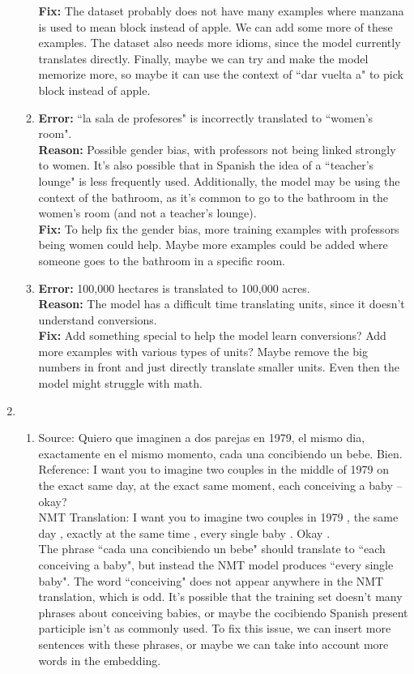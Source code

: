 \documentclass{article}
\begin{document}
\begin{enumerate}[label=(\alph*)]
\begin{enumerate}[label=\roman*.]
        \textbf{Fix:} The dataset probably does not have many examples where manzana is used to mean block instead of apple. We can add some more of these examples. The dataset also needs more idioms, since the model currently translates directly. Finally, maybe we can try and make the model memorize more, so maybe it can use the context of ``dar vuelta a" to pick block instead of apple.
        \item
        \textbf{Error:} ``la sala de profesores" is incorrectly translated to ``women's room". \\
        \textbf{Reason:} Possible gender bias, with professors not being linked strongly to women. It's also possible that in Spanish the idea of a ``teacher's lounge" is less frequently used. Additionally, the model may be using the context of the bathroom, as it's common to go to the bathroom in the women's room (and not a teacher's lounge). \\
        \textbf{Fix:} To help fix the gender bias, more training examples with professors being women could help. Maybe more examples could be added where someone goes to the bathroom in a specific room.
        \item
        \textbf{Error:} 100,000 hectares is translated to 100,000 acres. \\
        \textbf{Reason:} The model has a difficult time translating units, since it doesn't understand conversions. \\
        \textbf{Fix:} Add something special to help the model learn conversions? Add more examples with various types of units? Maybe remove the big numbers in front and just directly translate smaller units. Even then the model might struggle with math.
    \end{enumerate}
    \item 
    \begin{enumerate}[label=\arabic*.]
        \item 
        Source: Quiero que imaginen a dos parejas en 1979, el mismo dia, exactamente en el mismo momento, cada una concibiendo un bebe. Bien. \\
        Reference: I want you to imagine two couples  in the middle of 1979  on the exact same day, at the exact same moment,  each conceiving a baby -- okay? \\
        NMT Translation: I want you to imagine two couples in 1979 , the same day , exactly at the same time , every single baby . Okay . \\
        The phrase ``cada una concibiendo un bebe" should translate to ``each conceiving a baby", but instead the NMT model produces ``every single baby". The word ``conceiving" does not appear anywhere in the NMT translation, which is odd. It's possible that the training set doesn't many phrases about conceiving babies, or maybe the cocibiendo Spanish present participle isn't as commonly used. To fix this issue, we can insert more sentences with these phrases, or maybe we can take into account more words in the embedding.
        

\end{enumerate}
\end{enumerate}
\end{document}
